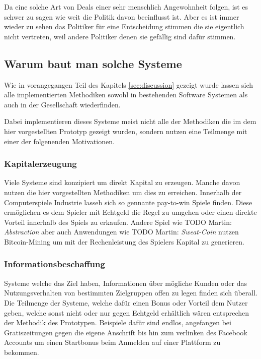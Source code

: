 \documentclass[german]{cgspaper} %
\newcommand{\todo}[1]{\textit{#1}}
\newcommand{\Martin}[1]{\textcolor{colorMartin}{TODO Martin:} \todo{#1} }
\begin{document}
Da eine solche Art von Deals einer sehr menschlich Angewohnheit folgen, ist es schwer zu sagen wie weit die Politik davon beeinflusst ist.
Aber es ist immer wieder zu sehen das Politiker für eine Entscheidung stimmen die sie eigentlich nicht vertreten, weil andere Politiker denen sie gefällig sind dafür stimmen. 

\subsection{Warum baut man solche Systeme}

Wie in vorangegangen Teil des Kapitels \ref{sec:discussion} gezeigt wurde lassen sich alle implementierten Methodiken sowohl in bestehenden Software Systemen als auch in der Gesellschaft wiederfinden.

Dabei implementieren dieses Systeme meist nicht alle der Methodiken die im dem hier vorgestellten Prototyp gezeigt wurden, sondern nutzen eine Teilmenge mit einer der folgenenden Motivationen.

\subsubsection{Kapitalerzeugung}

Viele Systeme sind konzipiert um direkt Kapital zu erzeugen.
Manche davon nutzen die hier vorgestellten Methodiken um dies zu erreichen. 
Innerhalb der Computerspiele Industrie lasseb sich so gennante pay-to-win Spiele finden.
Diese ermöglichen es dem Spieler mit Echtgeld die Regel zu umgehen oder einen direkte Vorteil innerhalb des Spiels zu erkaufen.
Andere Spiel wie \Martin{Abstraction} aber auch Anwendungen wie \Martin{Sweat-Coin} nutzen Bitcoin-Mining um mit der Rechenleistung des Spielers Kapital zu generieren.

\subsubsection{Informationsbeschaffung}

Systeme welche das Ziel haben, Informationen über mögliche Kunden oder das Nutzungsverhalten von bestimmten Zielgruppen offen zu legen finden sich überall.
Die Teilmenge der Systeme, welche dafür einen Bonus oder Vorteil dem Nutzer geben, welche sonst nicht oder nur gegen Echtgeld erhältlich wären entsprechen der Methodik des Prototypen.
Beispiele dafür sind endlos, angefangen bei Gratiszeitungen gegen die eigene Anschrift bis hin zum verlinken des Facebook Accounts um einen Startbonus beim Anmelden auf einer Plattform zu bekommen.
\end{document}
